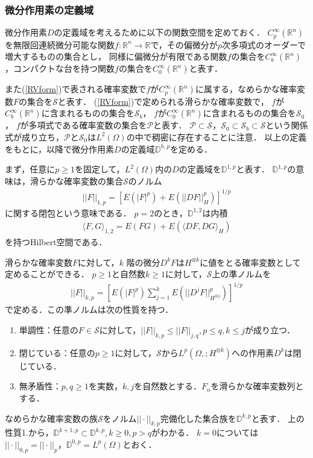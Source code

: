 \documentclass[a4paper,10pt]{jsarticle}
\theoremstyle{definition}
\newcommand{\eq}[1]{\begin{align}#1\end{align}}
\newcommand{\enums}[1]{\begin{enumerate}#1\end{enumerate}}
\begin{document}
\subsubsection{微分作用素の定義域}
微分作用素$D$の定義域を考えるために以下の関数空間を定めておく．
$C_p^\infty(\mathbb{R}^n)$を無限回連続微分可能な関数$f:\mathbb{R}^n\rightarrow\mathbb{R}$で，その偏微分が$p$次多項式のオーダーで増大するものの集合とし，
同様に偏微分が有限である関数$f$の集合を$C^\infty_b(\mathbb{R}^n)$，コンパクトな台を持つ関数$f$の集合を$C^\infty_0(\mathbb{R}^n)$と表す．

また(\ref{RVform})で表される確率変数で$f$が$C_p^\infty(\mathbb{R}^n)$に属する，なめらかな確率変数$F$の集合を$\mathcal{S}$と表す．
(\ref{RVform})で定められる滑らかな確率変数で，
$f$が$C_b^\infty(\mathbb{R}^n)$に含まれるものの集合を$\mathcal{S}_b$，
$f$が$C_0^\infty(\mathbb{R}^n)$に含まれるものの集合を$\mathcal{S}_0$，
$f$が多項式である確率変数の集合を$\mathcal{P}$と表す．
$\mathcal{P}\subset\mathcal{S}$，$\mathcal{S}_0\subset\mathcal{S}_b\subset\mathcal{S}$という関係式が成り立ち，$\mathcal{P}$と$\mathcal{S}_0$は$L^2(\Omega)$の中で稠密に存在することに注意．
以上の定義をもとに，以降で微分作用素$D$の定義域$\mathbb{D}^{h,p}$を定める．

まず，任意に$p\ge1$を固定して，$L^2(\Omega)$内の$D$の定義域を$\mathbb{D}^{1,p}$と表す．
$\mathbb{D}^{1,p}$の意味は，滑らかな確率変数の集合$\mathcal{S}$のノルム
\eq{||F||_{1,p}=\left[E(|F|^p)+E(||DF||_H^p)\right]^{1/p}}
に関する閉包という意味である．
$p=2$のとき，$\mathbb{D}^{1,2}$は内積
\eq{\langle F,G\rangle_{1,2}=E(FG)+E(\langle DF,DG\rangle_H)}
を持つHilbert空間である．

滑らかな確率変数$F$に対して，$k$ 階の微分$D^kF$は$H^{\otimes k}$に値をとる確率変数として定めることができる．
$p\ge1$と自然数$k\ge1$に対して，$\mathcal{S}$上の準ノルムを
\eq{||F||_{k,p}=\left[E(|F|^p)\sum_{j=1}^kE\left(||D^jF||^p_{H^{\otimes j}}\right)\right]^{1/p}}
で定める．この準ノルムは次の性質を持つ．
\enums{
	\item 単調性：任意の$F\in\mathcal{S}$に対して，$||F||_{k,p}\le||F||_{j,q},p\le q,k\le j$が成り立つ．
	\item 閉じている：任意の$p\ge1$に対して，$\mathcal{S}$から$L^p\left(\Omega,;H^{\otimes k}\right)$への作用素$D^k$は閉じている．
	\item 無矛盾性：$p,q\ge1$を実数，$k,j$を自然数とする．$F_n$を滑らかな確率変数列とする．
}

なめらかな確率変数の族$\mathcal{S}$をノルム$||\cdot||_{k,p}$完備化した集合族を$\mathbb{D}^{k,p}$と表す．
上の性質1.から，$\mathbb{D}^{k+1,p}\subset\mathbb{D}^{k,p},k\ge0,p>q$がわかる．
$k=0$については$||\cdot||_{0,p}=||\cdot||_p$，$\mathbb{D}^{0,p}=L^p(\Omega)$とおく．
\end{document}
